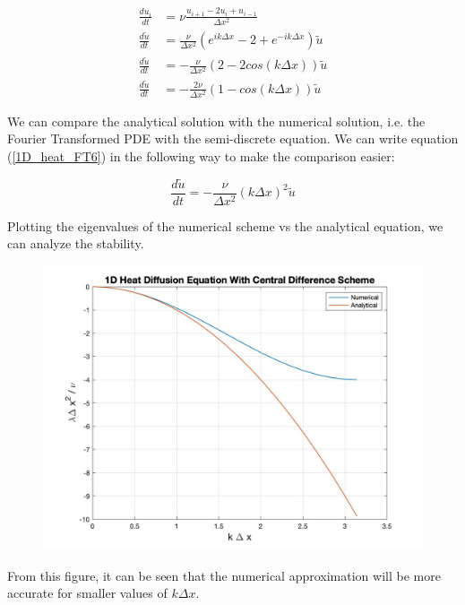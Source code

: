 \documentclass[10pt]{article}
\begin{document}
	\begin{equation} \label{1D_heat_semi}
		\begin{aligned}
			\frac{du_i}{dt} &= \nu \frac{u_{i+1} - 2u_i + u_{i-1}}{\Delta x^2}\\
			\frac{d \tilde u}{dt} &= \frac{\nu}{\Delta x^2} \left( e^{ik \Delta x} - 2 + e^{-ik \Delta x} \right) \tilde{u} \\
			\frac{d \tilde u}{dt} &= - \frac{\nu}{\Delta x^2} \left( 2 - 2cos(k \Delta x) \right) \tilde{u} \\
			\frac{d \tilde u}{dt} &= - \frac{2 \nu}{\Delta x^2} \left( 1 - cos(k \Delta x) \right) \tilde{u}
		\end{aligned}
	\end{equation}

	We can compare the analytical solution with the numerical solution, i.e. the Fourier Transformed PDE with the semi-discrete equation. We can write equation (\ref{1D_heat_FT6}) in the following way to make the comparison easier:
	
	\begin{equation} \label{1D_heat_FT7}
		\frac{d \tilde u}{dt} = -\frac{\nu}{\Delta x^2} (k \Delta x)^2 \tilde{u}
	\end{equation}

	Plotting the eigenvalues of the numerical scheme vs the analytical equation, we can analyze the stability.
	
	\begin{figure}[h]
		\includegraphics[width=12cm]{heat_central}
		\centering
	\end{figure}
	
	From this figure, it can be seen that the numerical approximation will be more accurate for smaller values of $k \Delta x$.
	
\end{document}
